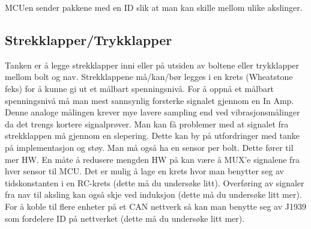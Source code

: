 MCUen sender pakkene med en ID slik at man kan skille mellom ulike akslinger. \\

\subsection{Strekklapper/Trykklapper}

Tanken er å legge strekklapper inni eller på utsiden av boltene eller
trykklapper mellom bolt og nav. Strekklappene
må/kan/bør legges i en krets (Wheatstone feks) for å kunne gi ut et målbart
spenningsnivå. For å oppnå et målbart spenningsnivå må man mest sannsynlig
forsterke signalet gjennom en In Amp. Denne analoge målingen krever mye lavere sampling end ved
vibrasjonsmålinger da det trengs kortere signalprøver.
Man kan få problemer med at signalet fra strekklappen må gjennom en slepering.
Dette kan by på utfordringer med tanke på implementasjon og støy.
Man må også ha en sensor per bolt. Dette fører til mer HW. En måte å redusere
mengden HW på kan være å MUX'e signalene fra hver sensor til MCU. Det er mulig å lage
en krets hvor man benytter seg av tidskonstanten i en RC-krets (dette må du
undersøke litt). Overføring av
signaler fra nav til aksling kan også skje ved induksjon (dette må du undersøke
litt mer). For å koble til flere
enheter på et CAN nettverk så kan man benytte seg av J1939 som fordelere ID på
nettverket (dette må du undersøke litt mer). \\

